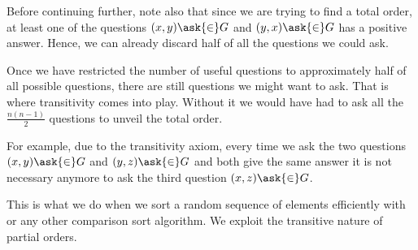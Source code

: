 Before continuing further, note also that since we are trying to find a total
order, at least one of the questions $(x, y) \ask{\in} G$ and $(y, x)
\ask{\in} G$ has a positive answer. Hence, we can already discard
half of all the questions we could ask.

Once we have restricted the number of useful questions to approximately
half of all possible questions, there are still  questions we
might want to ask. That is where transitivity comes into play. Without it we
would have had to ask all the $\frac{n (n-1)}{2}$ questions to unveil the total
order.

For example, due to the transitivity axiom, every time we ask the two questions
$(x, y) \ask{\in} G$ and $(y, z) \ask{\in} G$ and both give the
same answer it is not necessary anymore to ask the third question $(x, z)
\ask{\in} G$.

This is what we do when we sort a random sequence of elements
efficiently with \mergesort or any other  comparison sort
algorithm. We exploit the transitive nature of partial orders.
